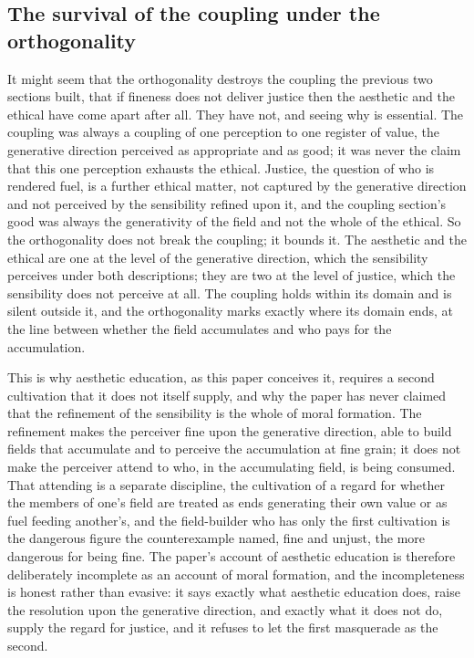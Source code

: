 \subsection{The survival of the coupling under the orthogonality}
\label{p22:sub:orth-coupling-survives}

It might seem that the orthogonality destroys the coupling the previous two sections built, that if fineness does not deliver justice then the aesthetic and the ethical have come apart after all. They have not, and seeing why is essential. The coupling was always a coupling of one perception to one register of value, the generative direction perceived as appropriate and as good; it was never the claim that this one perception exhausts the ethical. Justice, the question of who is rendered fuel, is a further ethical matter, not captured by the generative direction and not perceived by the sensibility refined upon it, and the coupling section's good was always the generativity of the field and not the whole of the ethical. So the orthogonality does not break the coupling; it bounds it. The aesthetic and the ethical are one at the level of the generative direction, which the sensibility perceives under both descriptions; they are two at the level of justice, which the sensibility does not perceive at all. The coupling holds within its domain and is silent outside it, and the orthogonality marks exactly where its domain ends, at the line between whether the field accumulates and who pays for the accumulation.

This is why aesthetic education, as this paper conceives it, requires a second cultivation that it does not itself supply, and why the paper has never claimed that the refinement of the sensibility is the whole of moral formation. The refinement makes the perceiver fine upon the generative direction, able to build fields that accumulate and to perceive the accumulation at fine grain; it does not make the perceiver attend to who, in the accumulating field, is being consumed. That attending is a separate discipline, the cultivation of a regard for whether the members of one's field are treated as ends generating their own value or as fuel feeding another's, and the field-builder who has only the first cultivation is the dangerous figure the counterexample named, fine and unjust, the more dangerous for being fine. The paper's account of aesthetic education is therefore deliberately incomplete as an account of moral formation, and the incompleteness is honest rather than evasive: it says exactly what aesthetic education does, raise the resolution upon the generative direction, and exactly what it does not do, supply the regard for justice, and it refuses to let the first masquerade as the second.

